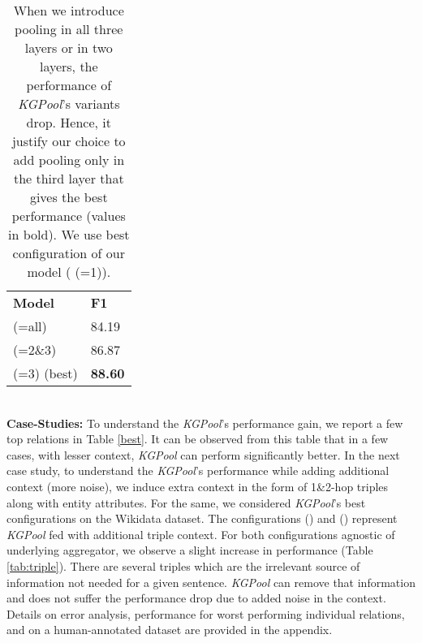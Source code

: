 \documentclass[11pt,a4paper]{article}
\newlength\Origarrayrulewidth
\newcommand{\Cline}[1]{\noalign{\global\setlength\Origarrayrulewidth{\arrayrulewidth}}\noalign{\global\setlength\arrayrulewidth{1.1pt}}\cline{#1}\noalign{\global\setlength\arrayrulewidth{\Origarrayrulewidth}}}
\begin{document}
\begin{table}[!htb]
    \centering
   \begin{tabular}{p{3.5cm}|p{0.8cm}}
\hline
\textbf{Model}  & \textbf{F1} \\
        \Cline{1-2}
 (=all) & 84.19 \\
  (=2\&3)  & 86.87 \\
           (=3) (best) & \textbf{88.60} \\
       \hline
    \end{tabular}
    \caption{When we introduce pooling in all three layers or in two layers, the performance of \textit{KGPool}'s variants drop. Hence, it justify our choice to add pooling only in the third layer that gives the best performance (values in bold). We use best configuration of our model ( (=1)).}
    \label{tab:pooling}
        \vspace{-2mm}
\end{table} 
\\
\textbf{Case-Studies:}
To understand the \textit{KGPool}'s performance gain, we report a few top relations in Table \ref{best}. It can be observed from this table that in a few cases, with lesser context, \textit{KGPool} can perform significantly better. In the next case study, to understand the \textit{KGPool}'s performance while adding additional context (more noise), we induce extra context in the form of 1\&2-hop triples along with entity attributes. For the same, we considered \textit{KGPool}'s best configurations on the Wikidata dataset. The configurations  () and  () represent \textit{KGPool} fed with additional triple context. For both configurations agnostic of underlying aggregator, we observe a slight increase in performance (Table \ref{tab:triple}). There are several triples which are the irrelevant source of information not needed for a given sentence. \textit{KGPool} can remove that information and does not suffer the performance drop due to added noise in the context. Details on error analysis, performance for worst performing individual relations, and on a human-annotated dataset are provided in the appendix.
\\
\end{document}
